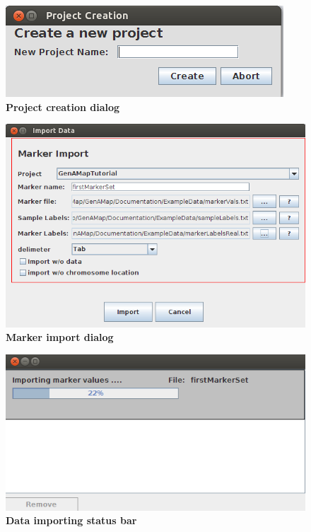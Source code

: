 \documentclass{article}
\begin{document}
\begin{figure}
\includegraphics[width=\textwidth]{projCreate.png}
\caption{\textbf{Project creation dialog}}
\label{projCreate}
\end{figure}

\begin{figure}
\includegraphics[width=\textwidth]{markerImport.png}
\caption{\textbf{Marker import dialog}}
\label{markerImport}
\end{figure}

\begin{figure}
\includegraphics[width=\textwidth]{importBar.png}
\caption{\textbf{Data importing status bar}}
\label{importBar}
\end{figure}
\end{document}
